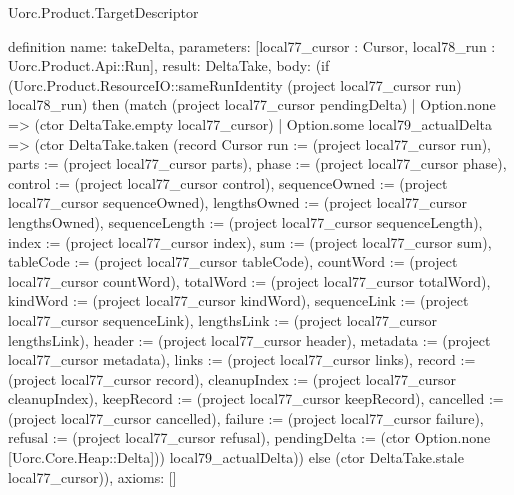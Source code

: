\begin{lexlean}{Uorc.Product.TargetDescriptor}
\begin{semanticmodule}
definition{
  name: takeDelta,
  parameters: [local77_cursor : Cursor, local78_run : Uorc.Product.Api::Run],
  result: DeltaTake,
  body: (if (Uorc.Product.ResourceIO::sameRunIdentity (project local77_cursor run) local78_run) then (match (project local77_cursor pendingDelta)
    | Option.none => (ctor DeltaTake.empty local77_cursor)
    | Option.some local79_actualDelta => (ctor DeltaTake.taken (record Cursor {run := (project local77_cursor run), parts := (project local77_cursor parts), phase := (project local77_cursor phase), control := (project local77_cursor control), sequenceOwned := (project local77_cursor sequenceOwned), lengthsOwned := (project local77_cursor lengthsOwned), sequenceLength := (project local77_cursor sequenceLength), index := (project local77_cursor index), sum := (project local77_cursor sum), tableCode := (project local77_cursor tableCode), countWord := (project local77_cursor countWord), totalWord := (project local77_cursor totalWord), kindWord := (project local77_cursor kindWord), sequenceLink := (project local77_cursor sequenceLink), lengthsLink := (project local77_cursor lengthsLink), header := (project local77_cursor header), metadata := (project local77_cursor metadata), links := (project local77_cursor links), record := (project local77_cursor record), cleanupIndex := (project local77_cursor cleanupIndex), keepRecord := (project local77_cursor keepRecord), cancelled := (project local77_cursor cancelled), failure := (project local77_cursor failure), refusal := (project local77_cursor refusal), pendingDelta := (ctor Option.none [Uorc.Core.Heap::Delta])}) local79_actualDelta)) else (ctor DeltaTake.stale local77_cursor)),
  axioms: []
}


\end{semanticmodule}
\end{lexlean}
